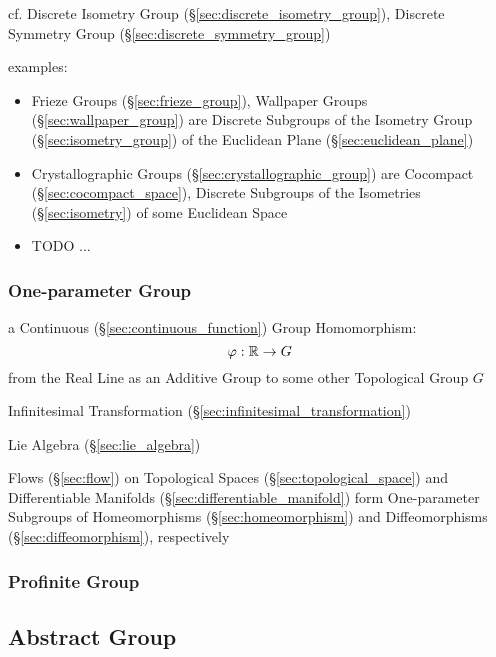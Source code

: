 \begin{itemize}
cf. Discrete Isometry Group (\S\ref{sec:discrete_isometry_group}), Discrete
Symmetry Group (\S\ref{sec:discrete_symmetry_group})

examples:
\begin{itemize}
  \item Frieze Groups (\S\ref{sec:frieze_group}), Wallpaper Groups
    (\S\ref{sec:wallpaper_group}) are Discrete Subgroups of the Isometry Group
    (\S\ref{sec:isometry_group}) of the Euclidean Plane
    (\S\ref{sec:euclidean_plane})
  \item Crystallographic Groups (\S\ref{sec:crystallographic_group}) are
    Cocompact (\S\ref{sec:cocompact_space}), Discrete Subgroups of the
    Isometries (\S\ref{sec:isometry}) of some Euclidean Space
  \item TODO
  ...
\end{itemize}



\subsubsection{One-parameter Group}\label{sec:one_parameter_group}

a Continuous (\S\ref{sec:continuous_function}) Group Homomorphism:
\[
  \varphi : \mathbb{R} \rightarrow G
\]
from the Real Line as an Additive Group to some other Topological Group $G$

Infinitesimal Transformation (\S\ref{sec:infinitesimal_transformation})

Lie Algebra (\S\ref{sec:lie_algebra})

Flows (\S\ref{sec:flow}) on Topological Spaces (\S\ref{sec:topological_space})
and Differentiable Manifolds (\S\ref{sec:differentiable_manifold}) form
One-parameter Subgroups of Homeomorphisms (\S\ref{sec:homeomorphism}) and
Diffeomorphisms (\S\ref{sec:diffeomorphism}), respectively



\subsubsection{Profinite Group}\label{sec:profinite_group}



\subsection{Abstract Group}\label{sec:abstract_group}


\end{itemize}
